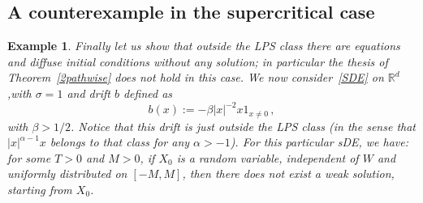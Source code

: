 \documentclass[a4paper,10pt]{article}
\newtheorem{example}[theorem]{Example}
\newcommand{\mr}{\mathbb{R}}
\begin{document}
\subsection{A counterexample in the supercritical case}

\begin{example}\label{counterex}
Finally let us show that outside the LPS class there are equations and diffuse initial conditions without any solution; in particular the thesis of Theorem~\ref{2pathwise} does not hold in this case. We now consider~\eqref{SDE} on $\mr^d$,with $\sigma = 1$ and drift $b$ defined as
\begin{equation*}
b(x) :=-\beta |x|^{-2} x 1_{x\neq0} \, ,
\end{equation*}
with $\beta>1/2$. Notice that this drift is just outside the LPS class (in the sense that $|x|^{\alpha-1}x$ belongs to that class for any $\alpha>-1$). For this particular sDE, we have: for some $T>0$ and $M>0$, if $X_0$ is a random variable, independent of $W$ and uniformly distributed on $[-M,M]$, then there does not exist a weak solution, starting from $X_0$.
\end{example}
\end{document}
